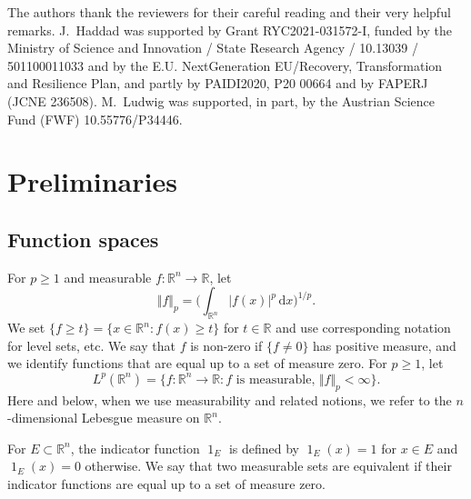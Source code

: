 \documentclass{amsart}
\newcommand{\dvtex}{\,\mathrm{d}}
\renewcommand{\chi}{\operatorname{1}}
\begin{document}
The authors thank the reviewers for their careful reading and their very
helpful remarks. J.~Haddad was supported by Grant RYC2021-031572-I, funded
by the Ministry of Science and Innovation / State Research Agency / 10.13039 / 501100011033
and by the E.U. NextGeneration EU/Recovery, Transformation and Resilience
Plan, and partly by PAIDI2020, P20 00664 and by FAPERJ (JCNE 236508). M.~Ludwig
was supported, in part, by the Austrian Science Fund (FWF) 10.55776/P34446.

\section{Preliminaries}
\label{sec_prelim}

\subsection{Function spaces}

For $p\ge 1$ and measurable $f:\mathbb R^{n}\to \mathbb R$, let
%
\begin{equation*}
\Vert f\Vert _{p} =\Big(\int _{\mathbb R^{n}} \vert f(x)\vert ^{p}\dvtex x
\Big)^{1/p}.
\end{equation*}
%
We set $\{f\ge t\}=\{ x\in \mathbb R^{n}: f(x)\ge t\}$ for
$t\in \mathbb R$ and use corresponding notation for level sets, etc. We
say that $f$ is non-zero if $\{f\ne 0\}$ has positive measure, and we identify
functions that are equal up to a set of measure zero. For $p\ge 1$, let
%
\begin{equation*}
L^{p}(\mathbb R^{n}) = \Big\{f: \mathbb R^{n}\to \mathbb R: f
\text{ is measurable}, \,\Vert f\Vert _{p} < \infty \Big\}.
\end{equation*}
%
Here and below, when we use measurability and related notions, we refer
to the $n$-dimensional Lebesgue measure on $\mathbb R^{n}$.

For $E\subset \mathbb R^{n}$, the indicator function $\chi _{E}$ is defined
by $\chi _{E}(x)=1$ for $x\in E$ and $\chi _{E}(x)=0$ otherwise. We say
that two measurable sets are equivalent if their indicator functions are
equal up to a set of measure zero.
\end{document}
